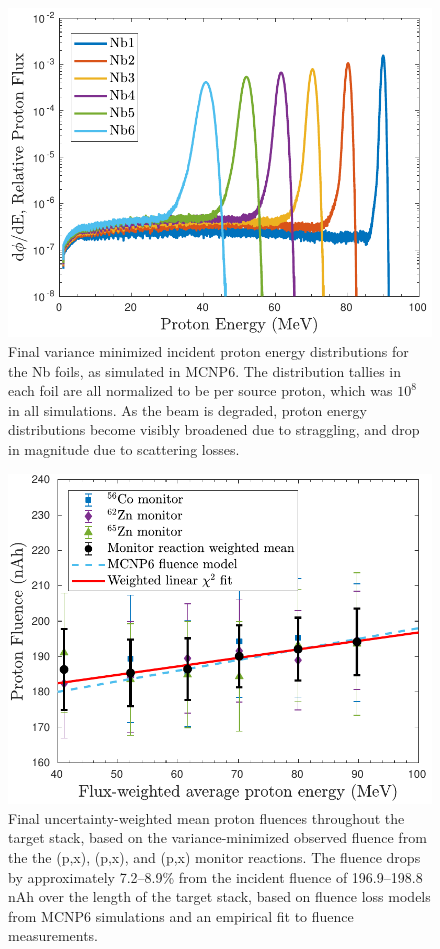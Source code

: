 \documentclass[3p]{elsarticle}
\begin{document}
\begin{figure}
 \centering
 \includegraphics[width=0.5\linewidth]{./figures/Nb_ptallies.pdf}
 \caption{Final variance minimized incident proton energy distributions for the Nb foils, as simulated in MCNP6. The distribution tallies in each foil are all normalized to be per source proton, which was $10^8$ in all simulations. As the beam is degraded, proton energy distributions become visibly broadened due to straggling, and drop in magnitude due to scattering losses.}
 \label{fig:Nb_ptallies}
\end{figure}

\begin{figure}
 \centering
 \includegraphics[width=0.5\linewidth]{./figures/fluence_plot.pdf}
 \caption{Final uncertainty-weighted mean proton fluences throughout the target stack, based on the variance-minimized observed fluence from the the  (p,x), (p,x), and (p,x) monitor reactions. 
  The fluence  drops by approximately 7.2--8.9\% from the incident fluence of 196.9--198.8 nAh over the length of the target stack, based on fluence loss models from MCNP6 simulations and an empirical fit to  fluence measurements.}  
 \label{fig:fluence_plot}
\end{figure}
\end{document}
